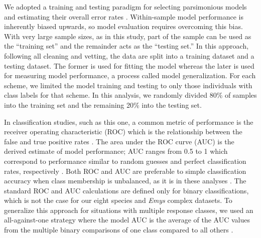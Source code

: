 \documentclass[10pt,letterpaper]{article}
\begin{document}
We adopted a training and testing paradigm for selecting parsimonious models and estimating their overall error rates \cite{Hastie2009,Kuhn2013}. Within-sample model performance is inherently biased upwards, so model evaluation requires overcoming this bias. With very large sample sizes, as in this study, part of the sample can be used as the ``training set'' and the remainder acts as the ``testing set.'' In this approach, following all cleaning and vetting, the data are split into a training dataset and a testing dataset. The former is used for fitting the model whereas the later is used for measuring model performance, a process called model generalization. For each scheme, we limited the model training and testing to only those individuals with class labels for that scheme. In this analysis, we randomly divided 80\% of samples into the training set and the remaining 20\% into the testing set. 

In classification studies, such as this one, a common metric of performance is the receiver operating characteristic (ROC) which is the relationship between the false and true positive rates \cite{Hastie2009}. The area under the ROC curve (AUC) is the derived estimate of model performance; AUC ranges from 0.5 to 1 which correspond to performance similar to random guesses and perfect classification rates, respectively \cite{Hastie2009}. Both ROC and AUC are preferable to simple classification accuracy when class membership is unbalanced, as it is in these analyses \cite{Hastie2009}. The standard ROC and AUC calculations are defined only for binary classifications, which is not the case for our eight species and \textit{Emys} complex datasets. To generalize this approach for situations with multiple response classes, we used an all-against-one strategy where the model AUC is the average of the AUC values from the multiple binary comparisons of one class compared to all others \cite{Hand2001}. 
\end{document}
